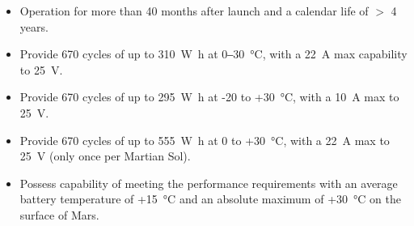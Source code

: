\begin{itemize}
  \item Operation for more than 40 months after launch and a calendar life of $>$ 4 years.
  \item Provide 670 cycles of up to \SI{310}{\watt\hour} at 0‒\SI{30}{\celsius}, with a \SI{22}{\ampere} max capability to \SI{25}{\volt}.
  \item Provide 670 cycles of up to \SI{295}{\watt\hour} at -20 to +\SI{30}{\celsius}, with a \SI{10}{\ampere} max to \SI{25}{\volt}.
  \item Provide 670 cycles of up to \SI{555}{\watt\hour} at 0 to +\SI{30}{\celsius}, with a \SI{22}{\ampere}  max to \SI{25}{\volt} (only once per Martian Sol).
  \item Possess capability of meeting the performance requirements with an average battery temperature of +\SI{15}{\celsius} and an absolute maximum of +\SI{30}{\celsius} on the surface of Mars.
\end{itemize}
